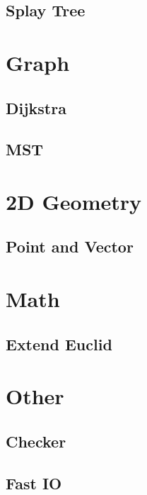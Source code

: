 \documentclass[twoside]{article}
\begin{document}
		\subsection{Splay Tree}
			
	\newpage
	\section{Graph}
		\subsection{Dijkstra}
		\subsection{MST}
	\newpage
	\section{2D Geometry}
		\subsection{Point and Vector}
	\newpage
	\section{Math}
		\subsection{Extend Euclid}
	\newpage
	\section{Other}
		\subsection{Checker}
			
		\subsection{Fast IO}
			
\end{document}
